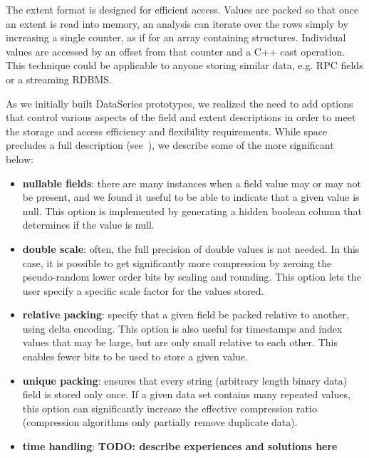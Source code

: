 \documentclass{acm_proc_article-sp}
\begin{document}
The extent format is designed for efficient access. Values are packed
so that once an extent is read into memory, an analysis can iterate
over the rows simply by increasing a single counter, as if for an
array containing structures.  Individual values are accessed by an
offset from that counter and a C++ cast operation. This technique
could be applicable to anyone storing similar data, e.g. RPC fields or
a streaming RDBMS.

As we initially built DataSeries prototypes, we realized the need to
add options that control various aspects of the field and extent
descriptions in order to meet the storage and access efficiency and
flexibility requirements.  While space precludes a full description
(see~\cite{DSTechnicalReportSnapshot}), we describe some of the more
significant below:


\begin{itemize}

\item \textbf{nullable fields}: there are many instances when a field
value may or may not be present, and we found it useful to be able to
indicate that a given value is null. This option is implemented by
generating a hidden boolean column that determines if the value is null.

\item \textbf{double scale}: often, the full precision of double
values is not needed. In this case, it is possible to get
significantly more compression by zeroing the pseudo-random lower
order bits by scaling and rounding. This option lets the user specify
a specific scale factor for the values stored.

\item \textbf{relative packing}: specify that a given field be packed
relative to another, using delta encoding. This option is also useful
for timestamps and index values that may be large, but are only small
relative to each other. This enables fewer bits to be used to store a
given value.

\item \textbf{unique packing}: ensures that every string (arbitrary
length binary data) field is stored only once. If a given data set
contains many repeated values, this option can significantly increase
the effective compression ratio (compression algorithms only partially
remove duplicate data).

\item \textbf{time handling}: {\bf TODO: describe experiences
and solutions here}

\end{itemize}
\end{document}
